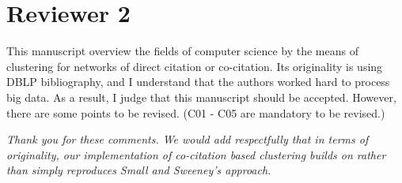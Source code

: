 \documentclass[11pt, oneside]{article}   	%
\begin{document}
\section*{Reviewer 2} 

This manuscript overview the fields of computer science by the means of clustering for networks of direct citation or co-citation. Its originality is using DBLP bibliography, and I understand that the authors worked hard to process big data. As a result, I judge that this manuscript should be accepted. However, there are some points to be revised. (C01 - C05 are mandatory to be revised.)

\emph{Thank you for these comments. We would add respectfully that in terms of originality, our implementation of co-citation based clustering builds on rather than simply reproduces Small and Sweeney's approach.} 
\end{document}
